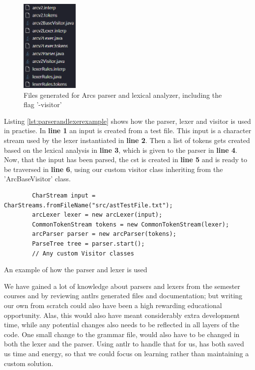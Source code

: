 \begin{figure}[htb!]
    \begin{center}
        \includegraphics[width=0.25\textwidth]{figures/lexerAndParserFiles.png}
        \caption{Files generated for Arcs parser and lexical analyzer, including the flag '-visitor'}
        \label{fig:lexerandparserfiles}
    \end{center}
\end{figure}

Listing \ref{lst:parserandlexerexample} shows how the parser, lexer and visitor is used in practise. In \textbf{line 1} an input is created from a test file. This input is a character stream used by the lexer instantiated in \textbf{line 2}. Then a list of tokens gets created based on the lexical analysis in \textbf{line 3}, which is given to the parser in \textbf{line 4}. Now, that the input has been parsed, the \gls{cst} is created in \textbf{line 5} and is ready to be traversed in \textbf{line 6}, using our custom visitor class inheriting from the 'ArcBaseVisitor' class.

\begin{listing}[htb!]
    \begin{verbatim}
        CharStream input = CharStreams.fromFileName("src/astTestFile.txt");
        arcLexer lexer = new arcLexer(input);
        CommonTokenStream tokens = new CommonTokenStream(lexer);
        arcParser parser = new arcParser(tokens);
        ParseTree tree = parser.start();
        // Any custom Visitor classes
    \end{verbatim}
    \caption{An example of how the parser and lexer is used}
    \label{lst:parserandlexerexample}
\end{listing}

We have gained a lot of knowledge about parsers and lexers from the semester courses and by reviewing \gls{antlr}s generated files and documentation; but writing our own from scratch could also have been a high rewarding educational opportunity. Alas, this would also have meant considerably extra development time, while any potential changes also needs to be reflected in all layers of the code. One small change to the grammar file, would also have to be changed in both the lexer and the parser. Using \gls{antlr} to handle that for us, has both saved us time and energy, so that we could focus on learning rather than maintaining a custom solution.